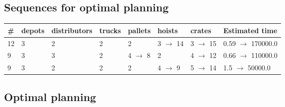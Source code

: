 \documentclass{article}
\begin{document}
                            \subsection*{Sequences for optimal planning}

                            \begin{center}
                            \begin{tabular}{@{}l|l|l|l|l|l|l|l@{}}
                            \# & depots & distributors & trucks & pallets & hoists & crates & Estimated time\\\midrule
                            12&3&2&2&2&3 $\rightarrow$ 14&3 $\rightarrow$ 15&0.59 $\rightarrow$ 170000.0\\
9&3&3&2&4 $\rightarrow$ 8&2&4 $\rightarrow$ 12&0.66 $\rightarrow$ 110000.0\\
9&3&2&2&2&4 $\rightarrow$ 9&5 $\rightarrow$ 14&1.5 $\rightarrow$ 50000.0
                            \end{tabular}
                            \end{center}
                    
                                \subsection*{Optimal planning}
                                
\end{document}
